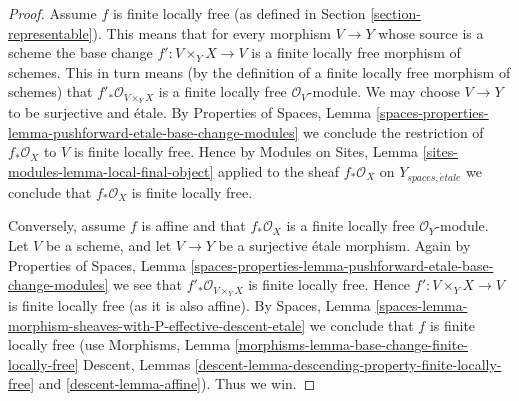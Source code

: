 \documentclass[10pt,a4paper]{amsart}
\theoremstyle{plain}
\theoremstyle{definition}
\theoremstyle{remark}
\numberwithin{equation}{subsection}
\def\etale{{\acute{e}tale}}
\begin{document}
\begin{proof}
Assume $f$ is finite locally free (as defined in
Section \ref{section-representable}). This means that
for every morphism $V \to Y$ whose source is a scheme the
base change $f' : V \times_Y X \to V$ is a finite locally free morphism
of schemes. This in turn means (by the definition of a finite locally
free morphism of schemes) that
$f'_*\mathcal{O}_{V \times_Y X}$
is a finite locally free $\mathcal{O}_V$-module. We may choose $V \to Y$
to be surjective and \'etale. By
Properties of Spaces,
Lemma \ref{spaces-properties-lemma-pushforward-etale-base-change-modules}
we conclude the restriction of $f_*\mathcal{O}_X$ to $V$ is
finite locally free. Hence by
Modules on Sites, Lemma \ref{sites-modules-lemma-local-final-object}
applied to the sheaf $f_*\mathcal{O}_X$ on $Y_{spaces, \etale}$
we conclude that $f_*\mathcal{O}_X$ is finite locally free.

\medskip\noindent
Conversely, assume $f$ is affine and that $f_*\mathcal{O}_X$ is a finite
locally free $\mathcal{O}_Y$-module. Let $V$ be a scheme, and let
$V \to Y$ be a surjective \'etale morphism. Again by
Properties of Spaces,
Lemma \ref{spaces-properties-lemma-pushforward-etale-base-change-modules}
we see that $f'_*\mathcal{O}_{V \times_Y X}$ is finite locally free.
Hence $f' : V \times_Y X \to V$ is finite locally free (as it is also affine).
By
Spaces,
Lemma \ref{spaces-lemma-morphism-sheaves-with-P-effective-descent-etale}
we conclude that $f$ is finite locally free (use
Morphisms, Lemma \ref{morphisms-lemma-base-change-finite-locally-free}
Descent, Lemmas \ref{descent-lemma-descending-property-finite-locally-free}
and \ref{descent-lemma-affine}). Thus we win.
\end{proof}
\end{document}
